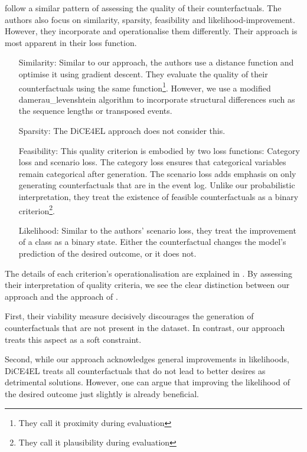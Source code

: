 \documentclass[./../../paper.tex]{subfiles}
\begin{document}
\citeauthor{hsieh_DiCE4ELInterpretingProcess_2021} follow a similar pattern of assessing the quality of their counterfactuals. The authors also focus on similarity, sparsity, feasibility and likelihood-improvement. However, they incorporate and operationalise them differently. Their approach is most apparent in their loss function.

\begin{itemize}
    \item[Similarity:] Similar to our approach, the authors use a distance function and optimise it using gradient descent. They evaluate the quality of their counterfactuals using the same function\footnote{They call it proximity during evaluation}. However, we use a modified \gls{damerau_levenshtein} algorithm to incorporate structural differences such as the sequence lengths or transposed events.      
    \item[Sparsity:] The DiCE4EL approach does not consider this.  
    \item[Feasibility:] This quality criterion is embodied by two loss functions: Category loss and scenario loss. The category loss ensures that categorical variables remain categorical after generation. The scenario loss adds emphasis on only generating counterfactuals that are in the event log. Unlike our probabilistic interpretation, they treat the existence of feasible counterfactuals as a binary criterion\footnote{They call it plausibility during evaluation}.   
    \item[Likelihood:] Similar to the authors' scenario loss, they treat the improvement of a class as a binary state. Either the counterfactual changes the model's prediction of the desired outcome, or it does not.
\end{itemize}

The details of each criterion's operationalisation are explained in \cite{hsieh_DiCE4ELInterpretingProcess_2021}. By assessing their interpretation of quality criteria, we see the clear distinction between our approach and the approach of \citeauthor{hsieh_DiCE4ELInterpretingProcess_2021}. 

First, their viability measure decisively discourages the generation of counterfactuals that are not present in the dataset. In contrast, our approach treats this aspect as a soft constraint. 

Second, while our approach acknowledges general improvements in likelihoods, DiCE4EL treats all counterfactuals that do not lead to better desires as detrimental solutions. However, one can argue that improving the likelihood of the desired outcome just slightly is already beneficial.
\end{document}
